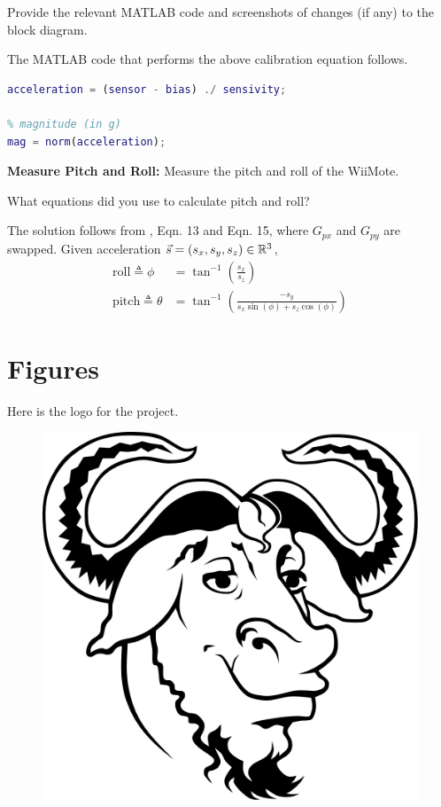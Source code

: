 \begin{asparaenum}
    \item Provide the relevant MATLAB code and screenshots of changes (if any) to the block diagram.
        \begin{solution}
        The MATLAB code that performs the above calibration equation follows.

\begin{lstlisting}[language=matlab]
% calibrate to units of g-forces (g)
acceleration = (sensor - bias) ./ sensivity;

% magnitude (in g)
mag = norm(acceleration);
\end{lstlisting}
        \end{solution}

\item \textbf{Measure Pitch and Roll:} Measure the pitch and roll of the WiiMote.

    \begin{compactenum}
    \item What equations did you use to calculate pitch and roll?
        \begin{solution}
        The solution follows from \cite{Ozyagcilar:11:ImplementingCompass}, Eqn. 13 and Eqn. 15, where $G_{px}$ and $G_{py}$ are swapped. Given acceleration $\vec{s}=(s_x,s_y,s_z)\in\mathbb{R}^3$,
        \begin{equation*}
        \begin{aligned}
        \text{roll}\triangleq\phi&=\tan^{-1}\left(\frac{s_x}{s_z}\right) \\
        \text{pitch}\triangleq\theta&=\tan^{-1}\left(\frac{-s_y}{s_x\sin(\phi)+s_z\cos(\phi)}\right)
        \end{aligned}
        \end{equation*}
        \end{solution}
    \end{compactenum}
\end{asparaenum}



\section{Figures}\label{sec:topic2-figures}
Here is the logo for the  project.

\begin{figure}[h]
\centering
\includegraphics[width=0.25\linewidth]{fig/gnu.png}
\end{figure}


